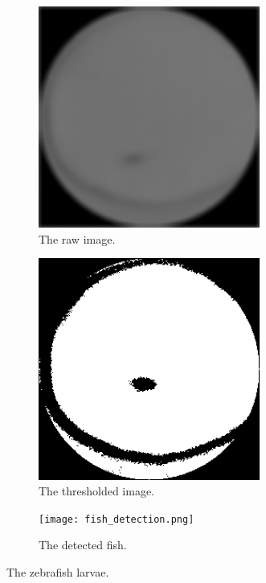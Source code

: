 \documentclass[10pt,a4paper, singlespace]{article}
\begin{document}
\begin{figure}[H]
	\centering
	\begin{subfigure}[b]{0.3\textwidth}
		\includegraphics[width=0.8\textwidth]{fish_raw.png}
		\caption{The raw image.}
		\label{fig:depth-b}
	\end{subfigure}\hfill
	\begin{subfigure}[b]{0.3\textwidth}	
		\includegraphics[width=0.8\textwidth]{fish_threshold_unblurred.png}
		\caption{The thresholded image.}
		\label{fig:depth-b-no-nan}
	\end{subfigure}\hfill
	\begin{subfigure}[b]{0.3\textwidth}
	\texttt{[image:  fish\_detection.png]}
		\caption{The detected fish.}
		\label{fig:depth-bilateral-no-nan}
	\end{subfigure}\hfill
	\caption{The zebrafish larvae.}
	\label{fig:testing}
\end{figure} 
\end{document}
